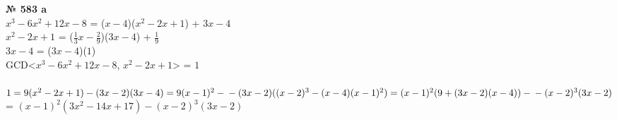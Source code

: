 \documentclass[12pt]{article}
\begin{document}
\vspace{.75cm}
{
	{\textbf{№ 583 a} \vspace{.25cm}\\}
$x^{3}-6x^{2}+12x-8$ = ($x-4$)($x^{2}-2x+1$) + $3x-4$\\
$x^{2}-2x+1$ = ($\frac{1}{3}x-\frac{2}{9}$)($3x-4$) + $\frac{1}{9}$\\
$3x-4$ = ($3x-4$)($1$)\\
GCD<$x^{3}-6x^{2}+12x-8$, $x^{2}-2x+1$> = $1$\\\\
$1 = 9(x^2-2x+1) - (3x-2)(3x-4) = 9(x-1)^2 -\\- (3x-2)((x-2)^3 - (x-4)(x-1)^2) = 
(x-1)^2(9 + (3x-2)(x-4)) -\\- (x-2)^3(3x-2)$ = $(x-1)^2(3x^2-14x+17)-(x-2)^3(3x-2)$	


}
\newpage
\end{document}
